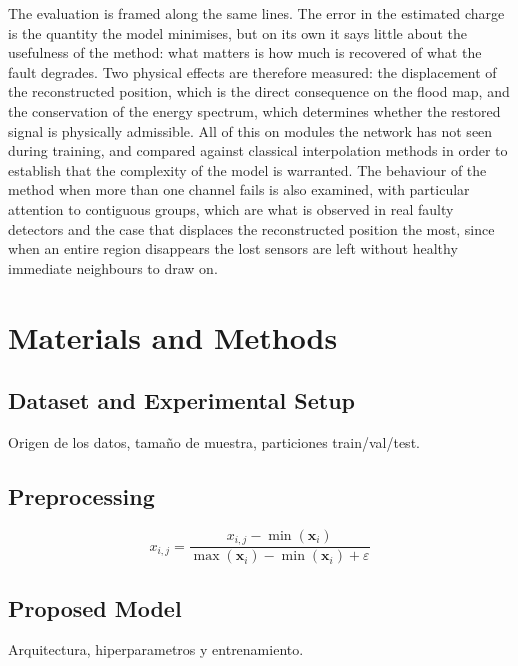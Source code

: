 \documentclass[10pt,conference]{IEEEtran}
\begin{document}
The evaluation is framed along the same lines. The error in the estimated
charge is the quantity the model minimises, but on its own it says little
about the usefulness of the method: what matters is how much is recovered of
what the fault degrades. Two physical effects are therefore measured: the
displacement of the reconstructed position, which is the direct consequence
on the flood map, and the conservation of the energy spectrum, which
determines whether the restored signal is physically admissible. All of this
on modules the network has not seen during training,
and compared against classical interpolation methods in order to establish
that the complexity of the model is warranted. The behaviour of the method
when more than one channel fails is also examined, with particular attention
to contiguous groups, which are what is observed in real faulty detectors
and the case that displaces the reconstructed position the most, since when an
entire region disappears the lost sensors are left without healthy immediate
neighbours to draw on.

\section{Materials and Methods}

\subsection{Dataset and Experimental Setup}

Origen de los datos, tama\~no de muestra, particiones train/val/test.

\subsection{Preprocessing}

\begin{equation}
x_{i,j} = \frac{x_{i,j} - \min(\mathbf{x}_i)}
               {\max(\mathbf{x}_i) - \min(\mathbf{x}_i) + \varepsilon}
\label{eq:norm}
\end{equation}

\subsection{Proposed Model}

Arquitectura, hiperparametros y entrenamiento.
\end{document}
